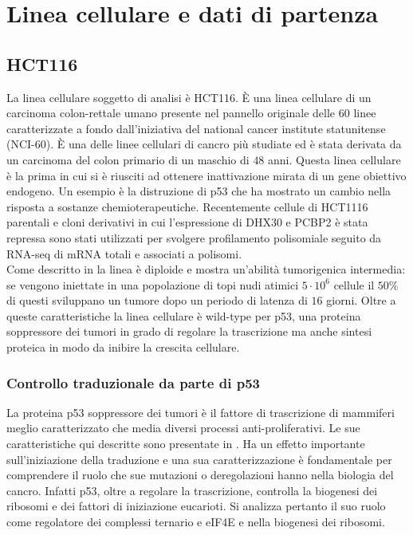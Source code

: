 \chapter{Linea cellulare e dati di partenza}
\label{cha:cell_lines}

\section{HCT116}
\label{sec:hct116}
La linea cellulare soggetto di analisi \`e HCT116.
\`E una linea cellulare di un carcinoma colon-rettale umano presente nel pannello originale delle $60$ linee caratterizzate a fondo dall'iniziativa del national cancer institute statunitense (NCI-$60$).
\`E una delle linee cellulari di cancro pi\`u studiate ed \`e stata derivata da un carcinoma del colon primario di un maschio di $48$ anni.
Questa linea cellulare \`e la prima in cui si \`e riusciti ad ottenere inattivazione mirata di un gene obiettivo endogeno.
Un esempio \`e la distruzione di p53 che ha mostrato un cambio nella risposta a sostanze chemioterapeutiche.\cite{p53disruption}
Recentemente cellule di HCT1116 parentali e cloni derivativi in cui l'espressione di DHX30 e PCBP2 \`e stata repressa sono stati utilizzati per svolgere profilamento polisomiale seguito da RNA-seq di mRNA totali e associati a polisomi.\\
Come descritto in \cite{hct116} la linea \`e diploide e mostra un'abilit\`a tumorigenica intermedia: se vengono iniettate in una popolazione di topi nudi atimici $5\cdot 10^6$ cellule il $50\%$ di questi sviluppano un tumore dopo un periodo di latenza di $16$ giorni.
Oltre a queste caratteristiche la linea cellulare \`e wild-type per p53, una proteina soppressore dei tumori in grado di regolare la trascrizione ma anche sintesi proteica in modo da inibire la crescita cellulare.

  \subsection{Controllo traduzionale da parte di p53}
  \label{subsec:p53}
  La proteina p53 soppressore dei tumori \`e il fattore di trascrizione di mammiferi meglio caratterizzato che media diversi processi anti-proliferativi.
  Le sue caratteristiche qui descritte sono presentate in \cite{transconp53}.
  Ha un effetto importante sull'iniziazione della traduzione e una sua caratterizzazione \`e fondamentale per comprendere il ruolo che sue mutazioni o deregolazioni hanno nella biologia del cancro.
  Infatti p53, oltre a regolare la trascrizione, controlla la biogenesi dei ribosomi e dei fattori di iniziazione eucarioti.
  Si analizza pertanto il suo ruolo come regolatore dei complessi ternario e eIF4E e nella biogenesi dei ribosomi.

